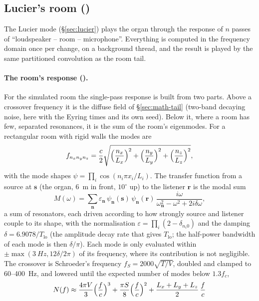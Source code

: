 \subsection{Lucier's room ()}
\label{sec:math-lucier}
The Lucier mode (\S\ref{sec:lucier}) plays the organ through the response of $n$ passes of
\enquote{loudspeaker -- room -- microphone}. Everything is computed in the frequency domain once per change, on
a background thread, and the result is played by the same partitioned convolution as the room tail.

\paragraph{The room's response ().} For the simulated room the single-pass response is built from
two parts. Above a crossover frequency it is the diffuse field of \S\ref{sec:math-tail} (two-band decaying noise,
here with the Eyring times and its own seed). Below it, where a room has few, separated resonances, it is the sum of
the room's eigenmodes. For a rectangular room with rigid walls the modes are
\begin{equation}
  f_{n_x n_y n_z} = \frac c2\sqrt{\Bigl(\frac{n_x}{L_x}\Bigr)^2 + \Bigl(\frac{n_y}{L_y}\Bigr)^2 + \Bigl(\frac{n_z}{L_z}\Bigr)^2},
\end{equation}
with the mode shapes $\psi = \prod_i\cos(n_i\pi x_i/L_i)$. The transfer function from a source at $\mathbf s$ (the
organ, \SI{6}{m} in front, $10^\circ$ up) to the listener $\mathbf r$ is the modal sum
\begin{equation}
  M(\omega) = \sum_{\mathbf n} \varepsilon_{\mathbf n}\,\psi_{\mathbf n}(\mathbf s)\,\psi_{\mathbf n}(\mathbf r)\,
  \frac{i\omega}{\omega_{\mathbf n}^2 - \omega^2 + 2i\delta\omega},
\end{equation}
a sum of resonators, each driven according to how strongly source and listener couple to its shape, with the
normalisation $\varepsilon = \prod_i(2-\delta_{n_i0})$ and the damping $\delta = 6.9078/T_\mathrm{lo}$ (the amplitude
decay rate that gives $T_\mathrm{lo}$; the half-power bandwidth of each mode is then $\delta/\pi$). Each mode is only
evaluated within $\pm\max(\SI{3}{Hz}, 12\delta/2\pi)$ of its frequency, where its contribution is not negligible. The
crossover is Schroeder's frequency $f_S = 2000\sqrt{T/V}$, doubled and clamped to 60--\SI{400}{Hz}, and lowered until
the expected number of modes below $1.3f_c$,
\begin{equation}
  N(f) \approx \frac{4\pi V}{3}\Bigl(\frac fc\Bigr)^3 + \frac{\pi S}{8}\Bigl(\frac fc\Bigr)^2 + \frac{L_x+L_y+L_z}{2}\,\frac fc
\end{equation}
